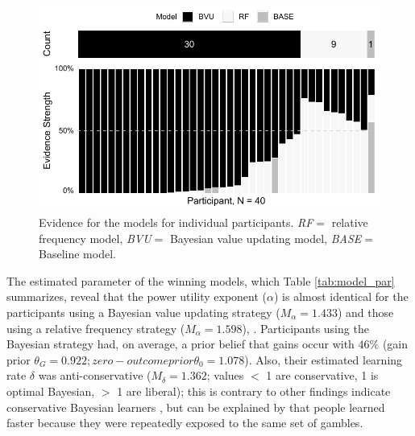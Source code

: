 \documentclass[a4paper, man, floatsintext]{apa6}
\begin{document}
\begin{figure}[H]

{\centering \includegraphics{../figures/model_weights-1} 

}

\caption{Evidence for the models for individual participants. \textit{RF}$=$ relative frequency model, \textit{BVU}$=$ Bayesian value updating model, \textit{BASE}$=$ Baseline model.}\label{fig:model_weights}
\end{figure}

The estimated parameter of the winning models, which Table
\ref{tab:model_par} summarizes, reveal that the power utility exponent
(\(\alpha\)) is almost identical for the participants using a Bayesian
value updating strategy (\(M_{\alpha}= 1.433\)) and those using a
relative frequency strategy (\(M_{\alpha}=1.598\)), . Participants using
the Bayesian strategy had, on average, a prior belief that gains occur
with \(46\%\) (gain prior
\(\theta_G = 0.922; zero-outcome prior \theta_0 = 1.078\)). Also, their
estimated learning rate \(\delta\) was anti-conservative
(\(M_{\delta}=1.362\); values \(<\) 1 are conservative, 1 is optimal
Bayesian, \(>\) 1 are liberal); this is contrary to other findings
indicate conservative Bayesian learners \citep{Edwards1967,Tauber2017},
but can be explained by that people learned faster because they were
repeatedly exposed to the same set of gambles.
\end{document}
